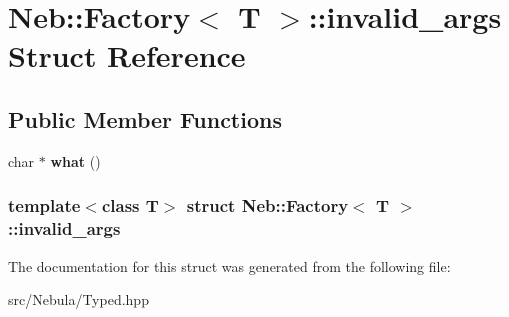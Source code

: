 \hypertarget{structNeb_1_1Factory_1_1invalid__args}{\section{\-Neb\-:\-:\-Factory$<$ \-T $>$\-:\-:invalid\-\_\-args \-Struct \-Reference}
\label{structNeb_1_1Factory_1_1invalid__args}
}
\subsection*{\-Public \-Member \-Functions}
\begin{DoxyCompactItemize}
\item 
\hypertarget{structNeb_1_1Factory_1_1invalid__args_a5c9ac7127ac812194052210d939fad5d}{char $\ast$ {\bfseries what} ()}\label{structNeb_1_1Factory_1_1invalid__args_a5c9ac7127ac812194052210d939fad5d}

\end{DoxyCompactItemize}
\subsubsection*{template$<$class T$>$ struct Neb\-::\-Factory$<$ T $>$\-::invalid\-\_\-args}



\-The documentation for this struct was generated from the following file\-:\begin{DoxyCompactItemize}
\item 
src/\-Nebula/\-Typed.\-hpp\end{DoxyCompactItemize}
